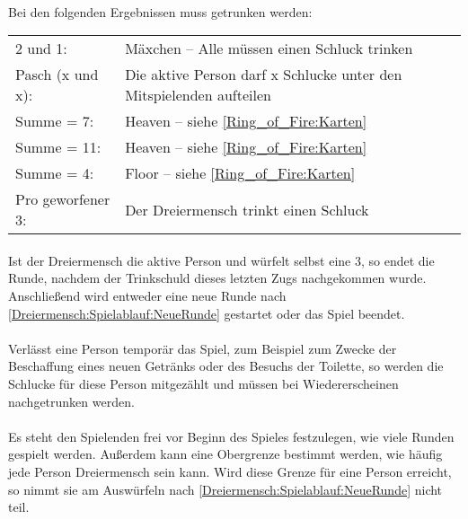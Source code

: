 \paragraph{}
Bei den folgenden Ergebnissen muss getrunken werden:

\begin{tabular}{p{8em} p{22em}}
     2 und 1: & Mäxchen – Alle müssen einen Schluck trinken\\
     Pasch (x und x): & Die aktive Person darf x Schlucke unter den Mitspielenden aufteilen\\
     Summe = 7: & Heaven – siehe \ref{Ring_of_Fire:Karten}\\
     Summe = 11: & Heaven – siehe \ref{Ring_of_Fire:Karten}\\
     Summe = 4: & Floor – siehe \ref{Ring_of_Fire:Karten}\\
     Pro geworfener 3: & Der Dreiermensch trinkt einen Schluck
\end{tabular}

\paragraph{}
Ist der Dreiermensch die aktive Person und würfelt selbst eine 3, so endet die Runde, nachdem der Trinkschuld dieses letzten Zugs nachgekommen wurde.
Anschließend wird entweder eine neue Runde nach \ref{Dreiermensch:Spielablauf:NeueRunde} gestartet oder das Spiel beendet.

\paragraph{}
Verlässt eine Person temporär das Spiel, zum Beispiel zum Zwecke der Beschaffung eines neuen Getränks oder des Besuchs der Toilette, so werden die Schlucke für diese Person mitgezählt und müssen bei Wiedererscheinen nachgetrunken werden.

\paragraph{}
Es steht den Spielenden frei vor Beginn des Spieles festzulegen, wie viele Runden gespielt werden.
Außerdem kann eine Obergrenze bestimmt werden, wie häufig jede Person Dreiermensch sein kann.
Wird diese Grenze für eine Person erreicht, so nimmt sie am Auswürfeln nach \ref{Dreiermensch:Spielablauf:NeueRunde} nicht teil.